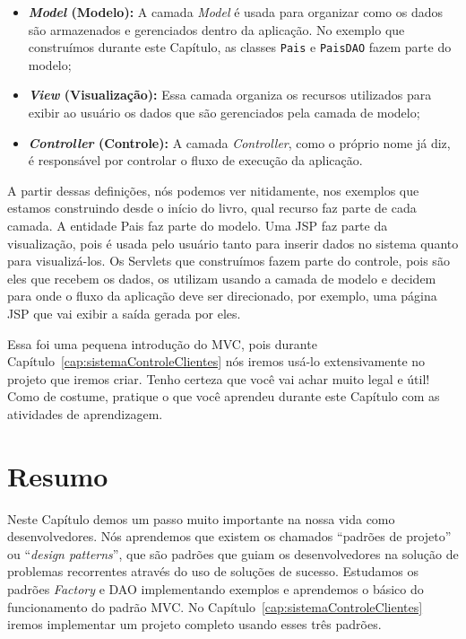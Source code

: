\begin{itemize}

    \item \textbf{\textit{Model} (Modelo):} A camada \textit{Model} é usada para organizar como os dados são armazenados e gerenciados dentro da aplicação. No exemplo que construímos durante este Capítulo, as classes \texttt{Pais} e \texttt{PaisDAO} fazem parte do modelo;
    
    \item \textbf{\textit{View} (Visualização):} Essa camada organiza os recursos utilizados para exibir ao usuário os dados que são gerenciados pela camada de modelo;
    
    \item \textbf{\textit{Controller} (Controle):} A camada \textit{Controller}, como o próprio nome já diz, é responsável por controlar o fluxo de execução da aplicação.
    
\end{itemize}

A partir dessas definições, nós podemos ver nitidamente, nos exemplos que estamos construindo desde o início do livro, qual recurso faz parte de cada camada. A entidade Pais faz parte do modelo. Uma JSP faz parte da visualização, pois é usada pelo usuário tanto para inserir dados no sistema quanto para visualizá-los. Os Servlets que construímos fazem parte do controle, pois são eles que recebem os dados, os utilizam usando a camada de modelo e decidem para onde o fluxo da aplicação deve ser direcionado, por exemplo, uma página JSP que vai exibir a saída gerada por eles.

Essa foi uma pequena introdução do MVC, pois durante Capítulo~\ref{cap:sistemaControleClientes} nós iremos usá-lo extensivamente no projeto que iremos criar. Tenho certeza que você vai achar muito legal e útil! Como de costume, pratique o que você aprendeu durante este Capítulo com as atividades de aprendizagem.


\section{Resumo}

Neste Capítulo demos um passo muito importante na nossa vida como desenvolvedores. Nós aprendemos que existem os chamados ``padrões de projeto'' ou ``\textit{design patterns}'', que são padrões que guiam os desenvolvedores na solução de problemas recorrentes através do uso de soluções de sucesso. Estudamos os padrões \textit{Factory} e DAO implementando exemplos e aprendemos o básico do funcionamento do padrão MVC. No Capítulo~\ref{cap:sistemaControleClientes} iremos implementar um projeto completo usando esses três padrões. 


